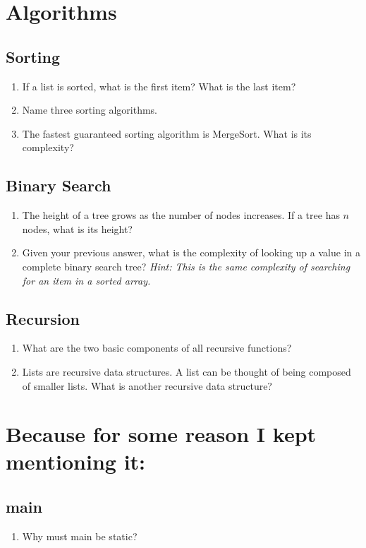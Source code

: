 \documentclass{article}
\begin{document}
\section{Algorithms}
	\subsection{Sorting}
		\begin{enumerate}
			\item If a list is sorted, what is the first item? What
			is the last item? 
			\item Name three sorting algorithms. 
			\item The fastest guaranteed sorting algorithm is
			MergeSort. What is its complexity? 
		\end{enumerate}
	\subsection{Binary Search}
	\begin{enumerate}
		\item The height of a tree grows as the number of nodes
		increases. If a tree has $n$ nodes, what is its height?
		\item Given your previous answer, what is the complexity of
		looking up a value in a complete binary search tree?
		\emph{Hint: This is the same complexity of searching for an
		item in a sorted array.} 
	\end{enumerate}
	\subsection{Recursion}
		\begin{enumerate}
			\item What are the two basic components of all
			recursive functions?  
			\item Lists are recursive data structures. A list can
			be thought of being composed of smaller lists. What is
			another recursive data structure? 
		\end{enumerate}
\section{Because for some reason I kept mentioning it:}
\subsection{\var main}
\begin{enumerate}
	\item Why must \var main be static? 
\end{enumerate}
\end{document}

